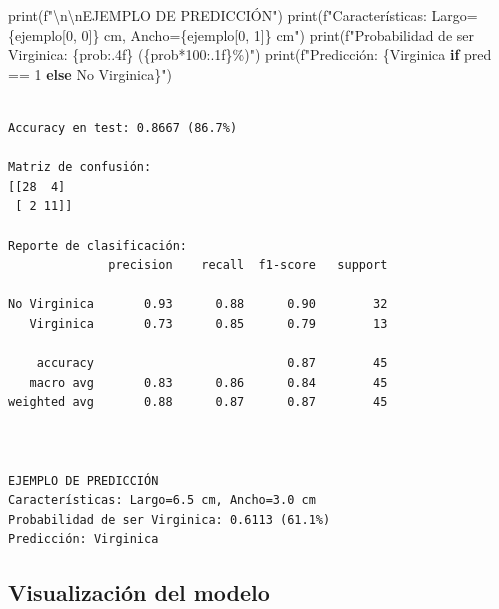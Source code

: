 \documentclass[
  doc,
  floatsintext,
  longtable,
  a4paper,
  nolmodern,
  notxfonts,
  notimes,
  12pt,
  colorlinks=true,linkcolor=blue,citecolor=blue,urlcolor=blue]{apa7}
\newenvironment{Shaded}{\begin{snugshade}}{\end{snugshade}}
\newcommand{\BuiltInTok}[1]{\textcolor[rgb]{0.00,0.23,0.31}{#1}}
\newcommand{\CharTok}[1]{\textcolor[rgb]{0.13,0.47,0.30}{#1}}
\newcommand{\ControlFlowTok}[1]{\textcolor[rgb]{0.00,0.23,0.31}{\textbf{#1}}}
\newcommand{\DecValTok}[1]{\textcolor[rgb]{0.68,0.00,0.00}{#1}}
\newcommand{\NormalTok}[1]{\textcolor[rgb]{0.00,0.23,0.31}{#1}}
\newcommand{\OperatorTok}[1]{\textcolor[rgb]{0.37,0.37,0.37}{#1}}
\newcommand{\SpecialCharTok}[1]{\textcolor[rgb]{0.37,0.37,0.37}{#1}}
\newcommand{\SpecialStringTok}[1]{\textcolor[rgb]{0.13,0.47,0.30}{#1}}
\newcommand{\StringTok}[1]{\textcolor[rgb]{0.13,0.47,0.30}{#1}}
\begin{document}
\begin{Shaded}
\begin{Highlighting}[]
\BuiltInTok{print}\NormalTok{(}\SpecialStringTok{f"}\CharTok{\textbackslash{}n\textbackslash{}n}\SpecialStringTok{EJEMPLO DE PREDICCIÓN"}\NormalTok{)}
\BuiltInTok{print}\NormalTok{(}\SpecialStringTok{f"Características: Largo=}\SpecialCharTok{\{}\NormalTok{ejemplo[}\DecValTok{0}\NormalTok{, }\DecValTok{0}\NormalTok{]}\SpecialCharTok{\}}\SpecialStringTok{ cm, Ancho=}\SpecialCharTok{\{}\NormalTok{ejemplo[}\DecValTok{0}\NormalTok{, }\DecValTok{1}\NormalTok{]}\SpecialCharTok{\}}\SpecialStringTok{ cm"}\NormalTok{)}
\BuiltInTok{print}\NormalTok{(}\SpecialStringTok{f"Probabilidad de ser Virginica: }\SpecialCharTok{\{}\NormalTok{prob}\SpecialCharTok{:.4f\}}\SpecialStringTok{ (}\SpecialCharTok{\{}\NormalTok{prob}\OperatorTok{*}\DecValTok{100}\SpecialCharTok{:.1f\}}\SpecialStringTok{\%)"}\NormalTok{)}
\BuiltInTok{print}\NormalTok{(}\SpecialStringTok{f"Predicción: }\SpecialCharTok{\{}\StringTok{\textquotesingle{}Virginica\textquotesingle{}} \ControlFlowTok{if}\NormalTok{ pred }\OperatorTok{==} \DecValTok{1} \ControlFlowTok{else} \StringTok{\textquotesingle{}No Virginica\textquotesingle{}}\SpecialCharTok{\}}\SpecialStringTok{"}\NormalTok{)}
\end{Highlighting}
\end{Shaded}

\begin{verbatim}

Accuracy en test: 0.8667 (86.7%)

Matriz de confusión:
[[28  4]
 [ 2 11]]

Reporte de clasificación:
              precision    recall  f1-score   support

No Virginica       0.93      0.88      0.90        32
   Virginica       0.73      0.85      0.79        13

    accuracy                           0.87        45
   macro avg       0.83      0.86      0.84        45
weighted avg       0.88      0.87      0.87        45



EJEMPLO DE PREDICCIÓN
Características: Largo=6.5 cm, Ancho=3.0 cm
Probabilidad de ser Virginica: 0.6113 (61.1%)
Predicción: Virginica
\end{verbatim}

\subsection{Visualización del modelo}\label{visualizaciuxf3n-del-modelo}
\end{document}
